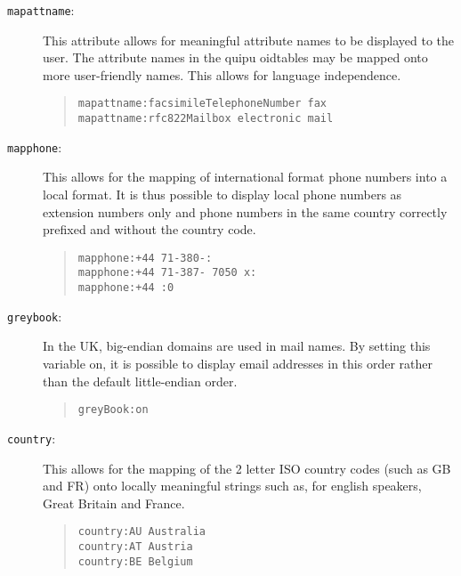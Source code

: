 \begin{description}
\item [\verb+mapattname+:]  This attribute allows for meaningful attribute 
names to be displayed to the user.  The attribute names in the quipu
oidtables may be mapped onto more user-friendly names.  This allows for 
language independence.  

\begin{quote}\small\begin{verbatim}
mapattname:facsimileTelephoneNumber fax
mapattname:rfc822Mailbox electronic mail
\end{verbatim}\end{quote}

\item [\verb+mapphone+:]  This allows for the mapping of international 
format phone
numbers into a local format.  It is thus possible to display local phone
numbers as extension numbers only and phone numbers in the same country
correctly prefixed and without the country code.

\begin{quote}\small\begin{verbatim}
mapphone:+44 71-380-:
mapphone:+44 71-387- 7050 x:
mapphone:+44 :0
\end{verbatim}\end{quote}

\item [\verb+greybook+:]  In the UK, big-endian domains are used in mail 
names.  By setting this variable on, it is possible to display email addresses 
in this order rather than the default little-endian order.

\begin{quote}\small\begin{verbatim}
greyBook:on
\end{verbatim}\end{quote}

\item [\verb+country+:]  This allows for the mapping of the 2 letter ISO 
country codes (such as GB and FR) onto locally meaningful strings such as, for
english speakers, Great Britain and France.

\begin{quote}\small\begin{verbatim}
country:AU Australia
country:AT Austria
country:BE Belgium
\end{verbatim}\end{quote}

\end{description}

